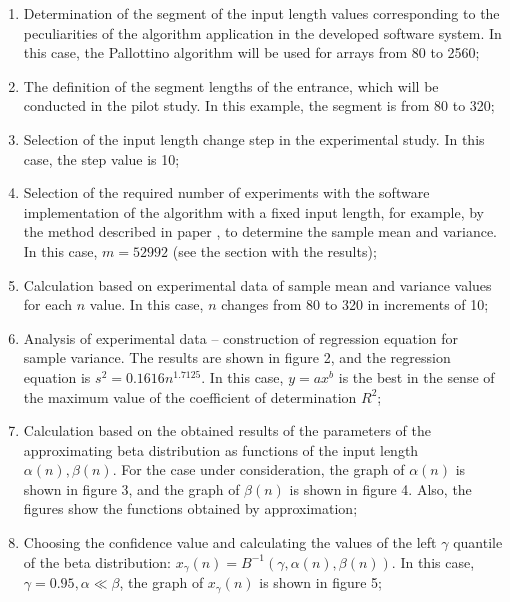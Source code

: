 \documentclass[a4paper]{article}
\begin{document}
\begin{enumerate}
	\item Determination of the segment of the input length values corresponding to the peculiarities of the algorithm application in the developed software system. In this case, the Pallottino algorithm will be used for arrays from 80 to 2560;
	
	\item The definition of the segment lengths of the entrance, which will be conducted in the pilot study. In this example, the segment is from 80 to 320;
	
	\item Selection of the input length change step in the experimental study. In this case, the step value is 10;
	
	\item Selection of the required number of experiments with the software implementation of the algorithm with a fixed input length, for example, by the method described in paper \cite{petrushyn_ulyanov_planning}, to determine the sample mean and variance. In this case, $m = 52992$ (see the section with the results);
	
	\item Calculation based on experimental data of sample mean and variance values for each $n$ value. In this case, $n$ changes from 80 to 320 in increments of 10;

	\item Analysis of experimental data – construction of regression equation for sample variance. The results are shown in figure 2, and the regression equation is $s^2 = 0.1616n^{1.7125}$. In this case, $y = ax^b$ is the best in the sense of the maximum value of the coefficient of determination $R^2$;
	
	\item Calculation based on the obtained results of the parameters of the approximating beta distribution as functions of the input length $\alpha(n), \beta(n)$. For the case under consideration, the graph of $\alpha(n)$ is shown in figure 3, and the graph of $\beta(n)$ is shown in figure 4. Also, the figures show the functions obtained by approximation;
	
	\item Choosing the confidence value and calculating the values of the left $\gamma$ quantile of the beta distribution: $x_\gamma(n) = B^{-1}(\gamma, \alpha(n), \beta(n))$. In this case, $\gamma = 0.95, \alpha \ll \beta$, the graph of $x_\gamma(n)$ is shown in figure 5;
	

\end{enumerate}
\end{document}
